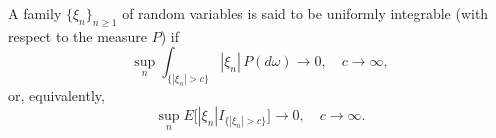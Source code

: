 A family $\{\xi_n\}_{n \geq 1}$ of random variables is said to be uniformly integrable (with respect to the measure $P$) if
$$\sup_n \int_{\{|\xi_n| > c\}} |\xi_n| \, P(d\omega) \to 0, \quad c \to \infty,$$
or, equivalently,
$$\sup_n E\bigl[|\xi_n| I_{\{|\xi_n| > c\}}\bigr] \to 0, \quad c \to \infty.$$
